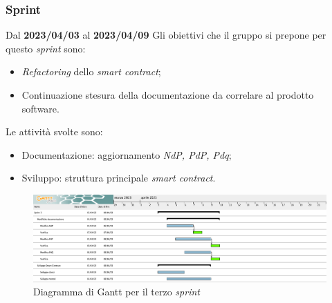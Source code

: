 \subsubsection{ Sprint}
Dal \textbf{2023/04/03} al \textbf{2023/04/09}
\newline
Gli obiettivi che il gruppo si prepone per questo \textit{sprint} sono:
\begin{itemize}
    \item \textit{Refactoring} dello \textit{smart contract};
    \item Continuazione stesura della documentazione da correlare al prodotto software.
\end{itemize}
Le attività svolte sono:
\begin{itemize}
    \item Documentazione: aggiornamento \textit{NdP, PdP, Pdq};
    \item Sviluppo: struttura principale \textit{smart contract}.
\end{itemize}
\begin{figure}[H]
    \centering
    \includegraphics[width=\textwidth]{src/img/Sprint 3.png}
    \caption{Diagramma di Gantt per il terzo \textit{sprint}}
\end{figure}
